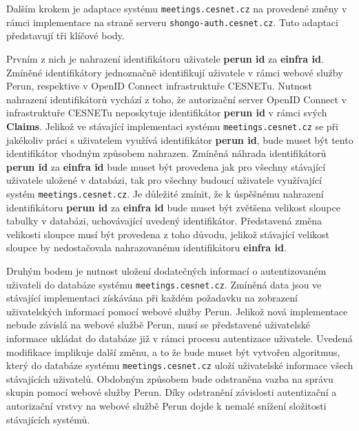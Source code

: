 \documentclass[
  printed, %
  twoside, %
  table,   %
  nolof,     %
  nolot,     %
]{fithesis3}
\begin{document}
Dalším krokem je adaptace systému \texttt{meetings.cesnet.cz} na provedené změny v rámci implementace na straně serveru \texttt{shongo-auth.cesnet.cz}. Tuto adaptaci představují tři klíčové body. 

\par 

Prvním z nich je nahrazení identifikátoru uživatele \textbf{perun id} za \textbf{einfra id}. Zmíněné identifikátory jednoznačně identifikují uživatele v rámci webové služby Perun, respektive v OpenID Connect infrastruktuře CESNETu. Nutnost nahrazení identifikátorů vychází z toho, že autorizační server OpenID Connect v infrastruktuře CESNETu neposkytuje identifikátor \textbf{perun id} v rámci svých \textbf{Claims}. Jelikož ve stávající implementaci systému \texttt{meetings.cesnet.cz} se při jakékoliv práci s uživatelem využívá identifikátor \textbf{perun id}, bude muset být tento identifikátor vhodným způsobem nahrazen. Zmíněná náhrada identifikátorů \textbf{perun id} za \textbf{einfra id} bude muset být provedena jak pro všechny stávající uživatele uložené v databázi, tak pro všechny budoucí uživatele využívající systém \texttt{meetings.cesnet.cz}. Je důležité zmínit, že k úspěšnému nahrazení identifikátoru \textbf{perun id} za \textbf{einfra id} bude muset být zvětšena velikost sloupce tabulky v databázi, uchovávající uvedený identifikátor. Představená změna velikosti sloupce musí být provedena z toho důvodu, jelikož stávající velikost sloupce by nedostačovala nahrazovanému identifikátoru \textbf{einfra id}. 
\par

Druhým bodem je nutnost uložení dodatečných informací o autentizovaném uživateli do databáze systému \texttt{meetings.cesnet.cz}. Zmíněná data jsou ve stávající implementaci získávána při každém požadavku na zobrazení uživatelských informací pomocí webové služby Perun. Jelikož nová implementace nebude závislá na webové službě Perun, musí se představené uživatelské informace ukládat do databáze již v rámci procesu autentizace uživatele. Uvedená modifikace implikuje další změnu, a to že bude muset být vytvořen algoritmus, který do databáze systému \texttt{meetings.cesnet.cz} uloží uživatelské informace všech stávajících uživatelů. Obdobným způsobem bude odstraněna vazba na správu skupin pomocí webové služby Perun. Díky odstranění závislosti autentizační a autorizační vrstvy na webové službě Perun dojde k nemalé snížení složitosti stávajících systémů.  \par 
\end{document}
